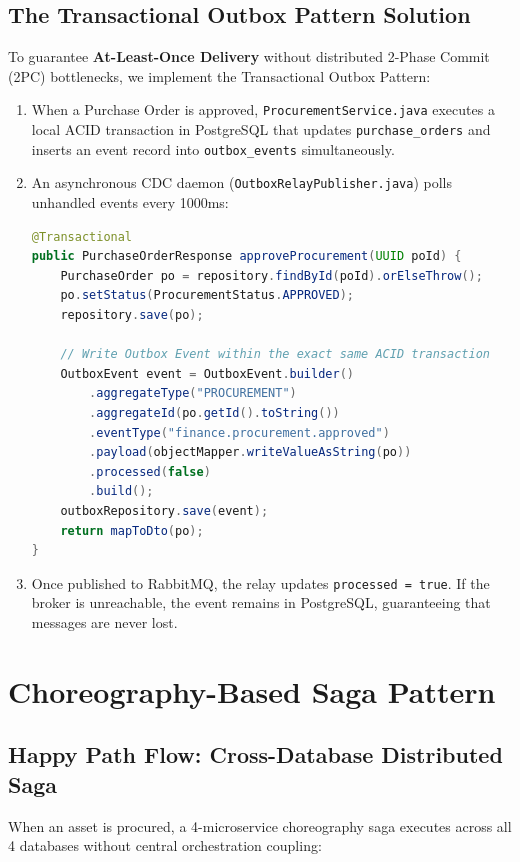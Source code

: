 \documentclass[11pt,a4paper]{article}
\begin{document}
\subsection{The Transactional Outbox Pattern Solution}
To guarantee \textbf{At-Least-Once Delivery} without distributed 2-Phase Commit (2PC) bottlenecks, we implement the Transactional Outbox Pattern:
\begin{enumerate}
    \item When a Purchase Order is approved, \texttt{ProcurementService.java} executes a local ACID transaction in PostgreSQL that updates \texttt{purchase\_orders} and inserts an event record into \texttt{outbox\_events} simultaneously.
    \item An asynchronous CDC daemon (\texttt{OutboxRelayPublisher.java}) polls unhandled events every 1000ms:
\begin{lstlisting}[language=Java, caption=Outbox Atomic Commit in ProcurementService.java]
@Transactional
public PurchaseOrderResponse approveProcurement(UUID poId) {
    PurchaseOrder po = repository.findById(poId).orElseThrow();
    po.setStatus(ProcurementStatus.APPROVED);
    repository.save(po);

    // Write Outbox Event within the exact same ACID transaction
    OutboxEvent event = OutboxEvent.builder()
        .aggregateType("PROCUREMENT")
        .aggregateId(po.getId().toString())
        .eventType("finance.procurement.approved")
        .payload(objectMapper.writeValueAsString(po))
        .processed(false)
        .build();
    outboxRepository.save(event);
    return mapToDto(po);
}
\end{lstlisting}
    \item Once published to RabbitMQ, the relay updates \texttt{processed = true}. If the broker is unreachable, the event remains in PostgreSQL, guaranteeing that messages are never lost.
\end{enumerate}

\newpage
\section{Choreography-Based Saga Pattern}

\subsection{Happy Path Flow: Cross-Database Distributed Saga}
When an asset is procured, a 4-microservice choreography saga executes across all 4 databases without central orchestration coupling:
\end{document}
